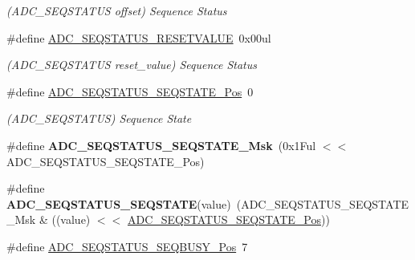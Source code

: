 \begin{DoxyCompactItemize}
\begin{DoxyCompactList}\small\item\em (A\+D\+C\+\_\+\+S\+E\+Q\+S\+T\+A\+T\+U\+S offset) Sequence Status \end{DoxyCompactList}\item 
\hypertarget{group___s_a_m_l21___a_d_c_gaba3add02f64dc4b7ebb7031cb2b6ac99}{}\#define \hyperlink{group___s_a_m_l21___a_d_c_gaba3add02f64dc4b7ebb7031cb2b6ac99}{A\+D\+C\+\_\+\+S\+E\+Q\+S\+T\+A\+T\+U\+S\+\_\+\+R\+E\+S\+E\+T\+V\+A\+L\+U\+E}~0x00ul\label{group___s_a_m_l21___a_d_c_gaba3add02f64dc4b7ebb7031cb2b6ac99}

\begin{DoxyCompactList}\small\item\em (A\+D\+C\+\_\+\+S\+E\+Q\+S\+T\+A\+T\+U\+S reset\+\_\+value) Sequence Status \end{DoxyCompactList}\item 
\hypertarget{group___s_a_m_l21___a_d_c_ga8399cbb5f6efffb2509f3e2a7f38dfa9}{}\#define \hyperlink{group___s_a_m_l21___a_d_c_ga8399cbb5f6efffb2509f3e2a7f38dfa9}{A\+D\+C\+\_\+\+S\+E\+Q\+S\+T\+A\+T\+U\+S\+\_\+\+S\+E\+Q\+S\+T\+A\+T\+E\+\_\+\+Pos}~0\label{group___s_a_m_l21___a_d_c_ga8399cbb5f6efffb2509f3e2a7f38dfa9}

\begin{DoxyCompactList}\small\item\em (A\+D\+C\+\_\+\+S\+E\+Q\+S\+T\+A\+T\+U\+S) Sequence State \end{DoxyCompactList}\item 
\hypertarget{group___s_a_m_l21___a_d_c_ga8f358b53fb44bcdd9bf2ac32b1c6059b}{}\#define {\bfseries A\+D\+C\+\_\+\+S\+E\+Q\+S\+T\+A\+T\+U\+S\+\_\+\+S\+E\+Q\+S\+T\+A\+T\+E\+\_\+\+Msk}~(0x1\+Ful $<$$<$ A\+D\+C\+\_\+\+S\+E\+Q\+S\+T\+A\+T\+U\+S\+\_\+\+S\+E\+Q\+S\+T\+A\+T\+E\+\_\+\+Pos)\label{group___s_a_m_l21___a_d_c_ga8f358b53fb44bcdd9bf2ac32b1c6059b}

\item 
\hypertarget{group___s_a_m_l21___a_d_c_gad9629092d6accd6710db1952fc784ab3}{}\#define {\bfseries A\+D\+C\+\_\+\+S\+E\+Q\+S\+T\+A\+T\+U\+S\+\_\+\+S\+E\+Q\+S\+T\+A\+T\+E}(value)~(A\+D\+C\+\_\+\+S\+E\+Q\+S\+T\+A\+T\+U\+S\+\_\+\+S\+E\+Q\+S\+T\+A\+T\+E\+\_\+\+Msk \& ((value) $<$$<$ \hyperlink{group___s_a_m_l21___a_d_c_ga8399cbb5f6efffb2509f3e2a7f38dfa9}{A\+D\+C\+\_\+\+S\+E\+Q\+S\+T\+A\+T\+U\+S\+\_\+\+S\+E\+Q\+S\+T\+A\+T\+E\+\_\+\+Pos}))\label{group___s_a_m_l21___a_d_c_gad9629092d6accd6710db1952fc784ab3}

\item 
\hypertarget{group___s_a_m_l21___a_d_c_ga258f054d0c4947367a214ca03aaade5c}{}\#define \hyperlink{group___s_a_m_l21___a_d_c_ga258f054d0c4947367a214ca03aaade5c}{A\+D\+C\+\_\+\+S\+E\+Q\+S\+T\+A\+T\+U\+S\+\_\+\+S\+E\+Q\+B\+U\+S\+Y\+\_\+\+Pos}~7\label{group___s_a_m_l21___a_d_c_ga258f054d0c4947367a214ca03aaade5c}


\end{DoxyCompactItemize}
